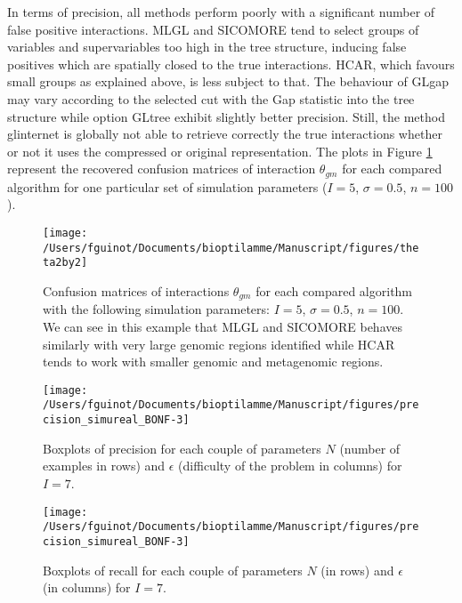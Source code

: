 \documentclass[]{book}
\begin{document}
In terms of precision, all methods perform poorly with a significant
number of false positive interactions. MLGL and SICOMORE tend to select
groups of variables and supervariables too high in the tree structure,
inducing false positives which are spatially closed to the true
interactions. HCAR, which favours small groups as explained above, is
less subject to that. The behaviour of GLgap may vary according to the
selected cut with the Gap statistic into the tree structure while option
GLtree exhibit slightly better precision. Still, the method glinternet
is globally not able to retrieve correctly the true interactions whether
or not it uses the compressed or original representation. The plots in
Figure \ref{fig:theta2by2} represent the recovered confusion matrices of
interaction \(\theta_{gm}\) for each compared algorithm for one particular
set of simulation parameters (\(I = 5\), \(\sigma = 0.5\), \(n=100\)).



\begin{figure}

{\centering \texttt{[image: /Users/fguinot/Documents/bioptilamme/Manuscript/figures/theta2by2]} 

}

\caption{Confusion matrices of interactions \(\theta_{gm}\) for each compared algorithm with the following simulation parameters: \(I = 5\), \(\sigma = 0.5\), \(n=100\). We can see in this example that MLGL and SICOMORE behaves similarly with very large genomic regions identified while HCAR tends to work with smaller genomic and metagenomic regions.}\label{fig:theta2by2}
\end{figure}



\begin{figure}

{\centering \texttt{[image: /Users/fguinot/Documents/bioptilamme/Manuscript/figures/precision\_simureal\_BONF-3]} 

}

\caption{Boxplots of precision for each couple of parameters \(N\) (number of examples in rows) and \(\epsilon\) (difficulty of the problem in columns) for \(I=7\).}\label{fig:precisionBONF}
\end{figure}



\begin{figure}

{\centering \texttt{[image: /Users/fguinot/Documents/bioptilamme/Manuscript/figures/precision\_simureal\_BONF-3]} 

}

\caption{Boxplots of recall for each couple of parameters \(N\) (in rows) and \(\epsilon\) (in columns) for \(I=7\).}\label{fig:recallBONF}
\end{figure}
\end{document}
